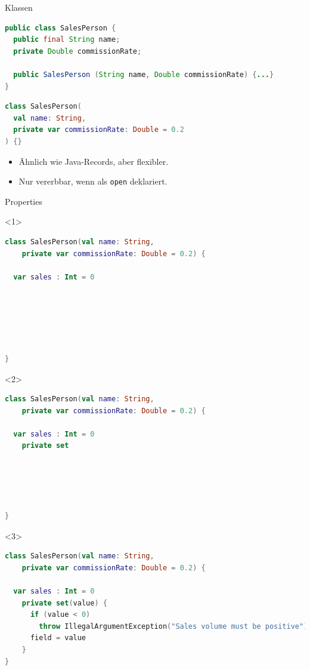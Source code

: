 \documentclass{beamer}
\begin{document}
\begin{frame}[fragile]{Klassen}
  \vspace{-0.25cm}
  \begin{lstlisting}[language=Java, title=Java, xleftmargin=1em]
public class SalesPerson {
  public final String name;
  private Double commissionRate;

  public SalesPerson (String name, Double commissionRate) {...}
}
  \end{lstlisting}
  \pause\vspace{-0.25cm}
  \begin{lstlisting}[language=Kotlin, title=Kotlin, xleftmargin=1em]
class SalesPerson(
  val name: String,
  private var commissionRate: Double = 0.2
) {}
  \end{lstlisting}
  \pause
  \begin{itemize}
    \item Ähnlich wie Java-Records, aber flexibler.
    \item Nur vererbbar, wenn als \texttt{open} deklariert.
  \end{itemize}
\end{frame}

\begin{frame}[fragile]{Properties}
  \begin{onlyenv}<1>
    \begin{lstlisting}[language=Kotlin, title=Kotlin: Properties, xleftmargin=1em]
class SalesPerson(val name: String, 
    private var commissionRate: Double = 0.2) {
            
  var sales : Int = 0



      
      
      
}
    \end{lstlisting}
  \end{onlyenv}
  \begin{onlyenv}<2>
    \begin{lstlisting}[language=Kotlin, title=Kotlin: Properties Zugriffsmodifikator, xleftmargin=1em]
class SalesPerson(val name: String, 
    private var commissionRate: Double = 0.2) {
      
  var sales : Int = 0
    private set





}
    \end{lstlisting}
  \end{onlyenv}
  \begin{onlyenv}<3>
    \begin{lstlisting}[language=Kotlin, title=Kotlin: Benutzerdefinierter Zugriffsmethoden, xleftmargin=1em]
class SalesPerson(val name: String, 
    private var commissionRate: Double = 0.2) {

  var sales : Int = 0
    private set(value) {
      if (value < 0)
        throw IllegalArgumentException("Sales volume must be positive")
      field = value
    }
}
    \end{lstlisting}
  \end{onlyenv}
\end{frame}
\end{document}
